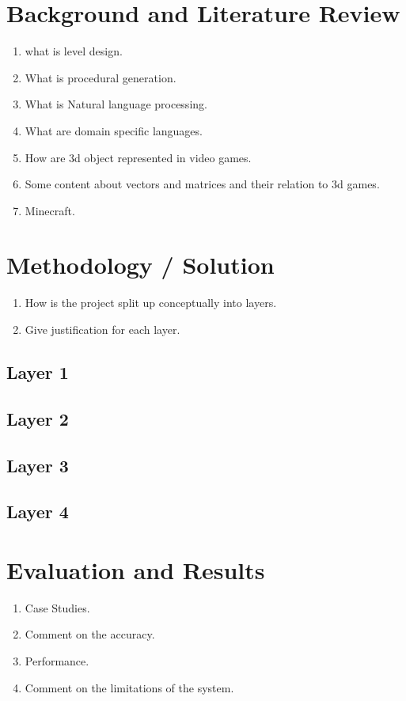 \documentclass{fict}
\begin{document}
\begin{flushleft}
\section*{Background and Literature Review}
\begin{enumerate}
    \item what is level design.
    \item What is procedural generation.
    \item What is Natural language processing.
    \item What are domain specific languages.
    \item How are 3d object represented in video games.
    \item Some content about vectors and matrices and their relation to 3d games.
    \item Minecraft.
\end{enumerate}

\section*{Methodology / Solution}
\begin{enumerate}
    \item How is the project split up conceptually into layers.
    \item Give justification for each layer.
\end{enumerate}

\subsection*{Layer 1}

\subsection*{Layer 2}

\subsection*{Layer 3}

\subsection*{Layer 4}


\section*{Evaluation and Results}
\begin{enumerate}
    \item Case Studies.
    \item Comment on the accuracy.
    \item Performance.
    \item Comment on the limitations of the system.
\end{enumerate}


\end{flushleft}
\end{document}
